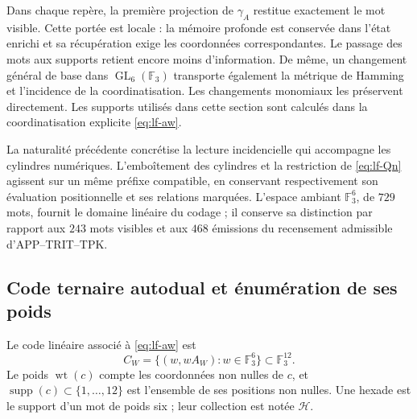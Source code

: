 Dans chaque repère, la première projection de \(\gamma_A\) restitue exactement le mot visible. Cette portée est locale : la mémoire profonde est conservée dans l'état enrichi et sa récupération exige les coordonnées correspondantes. Le passage des mots aux supports retient encore moins d'information. De même, un changement général de base dans \(\operatorname{GL}_6(\mathbb F_3)\) transporte également la métrique de Hamming et l'incidence de la coordinatisation. Les changements monomiaux les préservent directement. Les supports utilisés dans cette section sont calculés dans la coordinatisation explicite \eqref{eq:lf-aw}.

La naturalité précédente concrétise la lecture incidencielle qui
accompagne les cylindres numériques. L’emboîtement des cylindres
et la restriction de \eqref{eq:lf-Qn} agissent sur un même
préfixe compatible, en conservant respectivement son évaluation
positionnelle et ses relations marquées. L’espace ambiant
\(\mathbb F_3^6\), de \(729\) mots, fournit le domaine
linéaire du codage ; il conserve sa distinction par rapport aux
\(243\) mots visibles et aux \(468\) émissions du recensement
admissible d’APP--TRIT--TPK.

\subsection{Code ternaire autodual et énumération de ses poids}
\label{subsec:lf-code}

\begin{definition}
Le code linéaire associé à \eqref{eq:lf-aw} est
\[
 C_W=\{(w,wA_W):w\in\mathbb F_3^6\}\subset\mathbb F_3^{12}.
\]
Le poids \(\operatorname{wt}(c)\) compte les coordonnées non nulles de \(c\), et \(\operatorname{supp}(c)\subset\{1,\ldots,12\}\) est l'ensemble de ses positions non nulles. Une hexade est le support d'un mot de poids six ; leur collection est notée \(\mathcal H\).
\end{definition}

